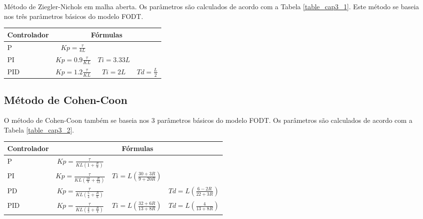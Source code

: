         Método de Ziegler-Nichols em malha aberta. Os parâmetros são calculados
        de acordo com a Tabela \ref{table_cap3_1}. Este método se baseia nos três parâmetros
        básicos do modelo \acs{FODT}.
       
        \newpage

        \begin{center}
            \begin{tabular}{l*{3}{c}}
            \label{table_cap3_1}
Controlador & \multicolumn{3}{c}{Fórmulas} \\
\hline
P   & $Kp = \frac{\tau}{kL}$     &              & \\
PI  & $Kp = 0.9 \frac{\tau}{KL}$ & $Ti = 3.33L$ & \\
PID & $Kp = 1.2 \frac{\tau}{KL}$ & $Ti = 2L$ & $Td = \frac{L}{2}$ \\
            \end{tabular}
        \end{center}
    
    \subsection{Método de Cohen-Coon}
        
        O método de Cohen-Coon também se baseia nos 3 parâmetros básicos
        do modelo \acs{FODT}. Os parâmetros são calculados de acordo com
        a Tabela \ref{table_cap3_2}.
        
        \begin{center}
            \begin{tabular}{l*{3}{c}}
	    \label{table_cap3_2}
Controlador & \multicolumn{3}{c}{Fórmulas} \\
\hline
P   & $Kp = \frac{\tau}{KL(1 + \frac{R}{3})}$             &              & \\
PI  & $Kp = \frac{\tau}{KL(\frac{10}{9} + \frac{R}{12})}$ & $Ti = L(\frac{30+3R}{9+20R})$ & \\
PD  & $Kp = \frac{\tau}{KL(\frac{5}{4} + \frac{R}{6})}$ & & $Td = L(\frac{6-2R}{22+3R})$ \\
PID & $Kp = \frac{\tau}{KL(\frac{4}{3} + \frac{R}{4})}$ & $Ti = L(\frac{32+6R}{13+8R})$ & $Td = L(\frac{4}{13+8R})$ \\
            \end{tabular}
        \end{center}
    
